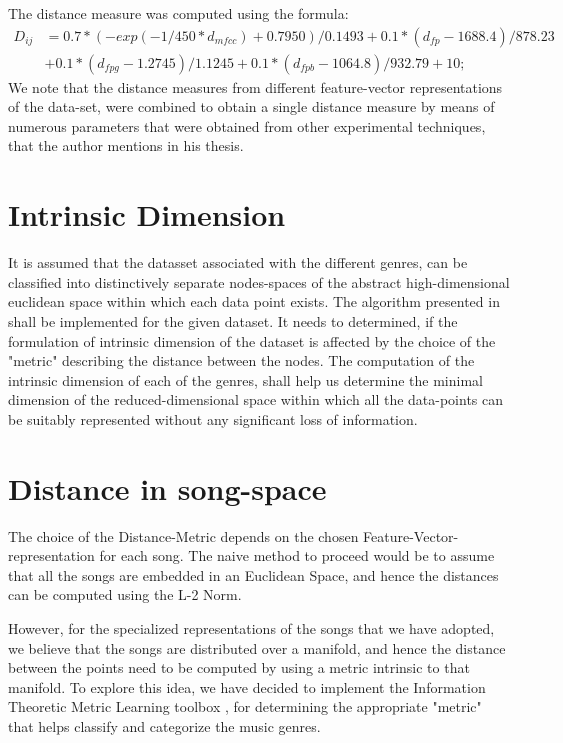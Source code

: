\documentclass[12pt]{article}
\begin{document}
The distance measure was computed using the formula:
\begin{align*}
D_{ij} &= 0.7*(-exp(-1/450*d_{mfcc})+0.7950)/0.1493 + 0.1*(d_{fp}-1688.4)/878.23 \\
&+ 0.1*(d_{fpg}-1.2745)/1.1245 + 0.1*(d_{fpb}-1064.8)/932.79 + 10; 
\end{align*}
We note that the distance measures from different feature-vector representations of the data-set, were combined to obtain a single distance measure by means of numerous parameters that were obtained from other experimental techniques, that the author mentions in his thesis. 
         

\section{Intrinsic Dimension}

It is assumed that the datasset associated with the different genres, can be classified into distinctively separate nodes-spaces of the abstract high-dimensional euclidean space within which each data point exists. The algorithm presented in \cite{intrinsicDims} shall be implemented for the given dataset. It needs to determined, if the formulation of intrinsic dimension of the dataset is affected by the choice of the "metric" describing the distance between the nodes. The computation of the intrinsic dimension of each of the genres, shall help us determine the minimal dimension of the reduced-dimensional space within which all the data-points can be suitably represented without any significant loss of information. 


\section{Distance in song-space}

The choice of the Distance-Metric depends on the chosen Feature-Vector-representation for each song. The naive method to proceed would be to assume that all the songs are embedded in an Euclidean Space, and hence the distances can be computed using the L-2 Norm. 

However, for the specialized representations of the songs that we have adopted, we believe that the songs are distributed over a manifold, and hence the distance between the points need to be computed by using a metric intrinsic to that manifold. To explore this idea, we have decided to implement the Information Theoretic Metric Learning toolbox \cite{infoTheoryMetricLearning}, for determining the appropriate "metric" that helps classify and categorize the music genres. 
\end{document}
